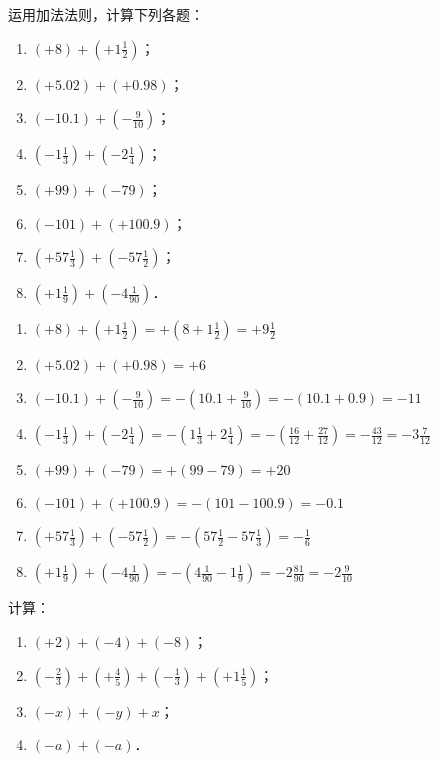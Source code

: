 \begin{example}
	运用加法法则，计算下列各题：
	\begin{multicols}{2}
		\begin{enumerate}
			\item $(+8)+\left(+1\frac{1}{2}\right)$；
			\item $(+5.02)+\left(+0.98\right)$；
			\item $(-10.1)+\left(-\frac{9}{10}\right)$；
			\item $\left(-1\frac{1}{3}\right)+\left(-2\frac{1}{4}\right)$；
			\item $(+99)+(-79)$；
			\item $(-101)+(+100.9)$；
			\item $(+57\frac{1}{3})+\left(-57\frac{1}{2}\right)$；
			\item $\left(+1\frac{1}{9}\right)+\left(-4\frac{1}{90}\right)$．
		\end{enumerate}
	\end{multicols}
\end{example}    

\begin{solution}
	\begin{enumerate}
		\item $(+8)+\left(+1\frac{1}{2}\right)=+\left(8+1\frac{1}{2}\right)=+9\frac{1}{2}$
		\item $(+5.02)+\left(+0.98\right)=+6$
		\item $(-10.1)+\left(-\frac{9}{10}\right)=-\left(10.1+\frac{9}{10}\right)=-(10.1+0.9)=-11$
		\item $\left(-1\frac{1}{3}\right)+\left(-2\frac{1}{4}\right)=-\left(1\frac{1}{3}+2\frac{1}{4}\right)=-\left(\frac{16}{12}+\frac{27}{12}\right)=-\frac{43}{12}=-3\frac{7}{12}$
		\item $(+99)+(-79)=+(99-79)=+20$
		\item $(-101)+(+100.9)=-(101-100.9)=-0.1$
		\item $(+57\frac{1}{3})+\left(-57\frac{1}{2}\right)=-\left(57\frac{1}{2}-57\frac{1}{3}\right)=-\frac{1}{6}$
		\item $\left(+1\frac{1}{9}\right)+\left(-4\frac{1}{90}\right)=-\left(4\frac{1}{90}-1\frac{1}{9}\right)=-2\frac{81}{90}=-2\frac{9}{10}$
		
	\end{enumerate}
	
\end{solution}

\begin{example}
	计算：
	\begin{enumerate}
		\item $(+2)+(-4)+(-8)$；
		\item $\left(-\frac{2}{3}\right)+\left(+\frac{4}{5}\right)+\left(-\frac{1}{3}\right)+\left(+1\frac{1}{5}\right)$；
		\item $(-x)+(-y)+x$；
		\item $(-a)+(-a)$．
	\end{enumerate}
\end{example}

